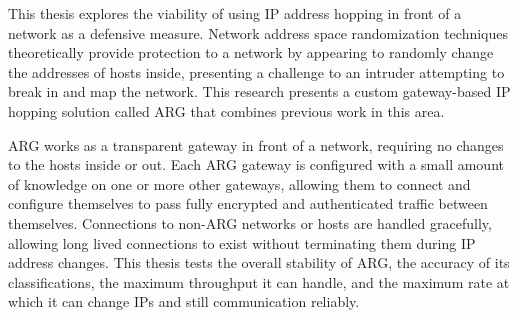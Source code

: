 \par This thesis explores the viability of using \ac{IP} address hopping in front of a network as a defensive measure. Network address space randomization techniques theoretically provide protection to a network by appearing to randomly change the addresses of hosts inside, presenting a challenge to an intruder attempting to break in and map the network. This research presents a custom gateway-based \ac{IP} hopping solution called \ac{ARG} that combines previous work in this area.

\par \ac{ARG} works as a transparent gateway in front of a network, requiring no changes to the hosts inside or out. Each \ac{ARG} gateway is configured with a small amount of knowledge on one or more other gateways, allowing them to connect and configure themselves to pass fully encrypted and authenticated traffic between themselves. Connections to non-\ac{ARG} networks or hosts are handled gracefully, allowing long lived connections to exist without terminating them during \ac{IP} address changes. This thesis tests the overall stability of \ac{ARG}, the accuracy of its classifications, the maximum throughput it can handle, and the maximum rate at which it can change \acp{IP} and still communication reliably.

\par {}


